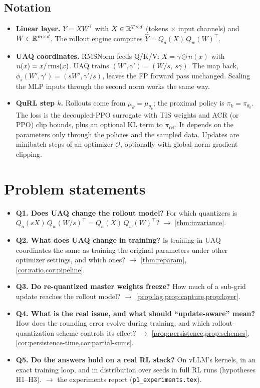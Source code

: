 \documentclass[11pt]{article}
\begin{document}
\subsection{Notation}\label{sec:notation}
\begin{itemize}
\item \textbf{Linear layer.} $Y=XW^\top$ with $X\in\mathbb{R}^{T\times d}$ (tokens $\times$ input channels) and $W\in\mathbb{R}^{m\times d}$. The rollout engine computes $\hat Y=Q_a(X)\,Q_w(W)^\top$.
\item \textbf{UAQ coordinates.} RMSNorm feeds Q/K/V: $X=\gamma\odot n(x)$ with $n(x)=x/\operatorname{rms}(x)$. UAQ trains $(W',\gamma')=(W/s,\ s\gamma)$. The map back, $\phi_s(W',\gamma')=(sW',\gamma'/s)$, leaves the FP forward pass unchanged. Scaling the MLP inputs through the second norm works the same way.
\item \textbf{QuRL step $k$.} Rollouts come from $\mu_k=\mu_{\theta_k}$; the proximal policy is $\pi_k=\pi_{\theta_k}$. The loss is the decoupled-PPO surrogate \citep{hilton2022batch} with TIS weights and ACR (or PPO) clip bounds, plus an optional KL term to $\pi_{\mathrm{ref}}$. It depends on the parameters only through the policies and the sampled data. Updates are minibatch steps of an optimizer $\mathcal O$, optionally with global-norm gradient clipping.
\end{itemize}

\section{Problem statements}\label{sec:problems}
\begin{itemize}
\item \textbf{Q1. Does UAQ change the rollout model?} For which quantizers is $Q_a(sX)\,Q_w(W/s)^\top=Q_a(X)\,Q_w(W)^\top$? $\to$ \cref{thm:invariance}.
\item \textbf{Q2. What does UAQ change in training?} Is training in UAQ coordinates the same as training the original parameters under other optimizer settings, and which ones? $\to$ \cref{thm:reparam}, \cref{cor:ratio,cor:pipeline}.
\item \textbf{Q3. Do re-quantized master weights freeze?} How much of a sub-grid update reaches the rollout model? $\to$ \cref{prop:lag,prop:capture,prop:layer}.
\item \textbf{Q4. What is the real issue, and what should ``update-aware'' mean?} How does the rounding error evolve during training, and which rollout-quantization scheme controls its effect? $\to$ \cref{prop:persistence,prop:schemes}, \cref{cor:persistence-time,cor:partial-sums}.
\item \textbf{Q5. Do the answers hold on a real RL stack?} On vLLM's kernels, in an exact training loop, and in distribution over seeds in full RL runs (hypotheses H1--H3). $\to$ the experiments report (\texttt{p1\_experiments.tex}).
\end{itemize}
\end{document}
